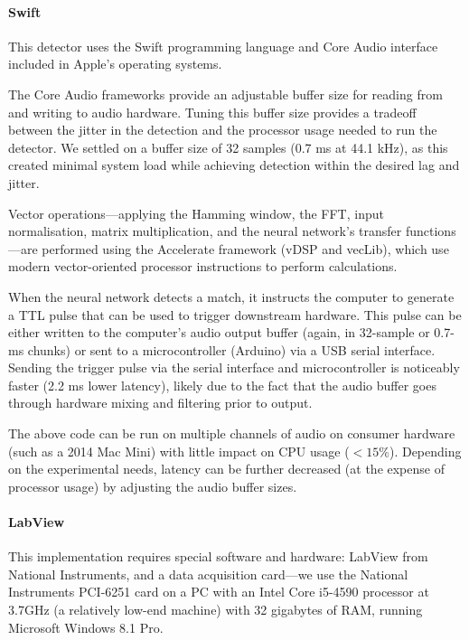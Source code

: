 \documentclass[10pt,letterpaper]{article}
\renewcommand{\subsubsection}[1]{\paragraph{#1}}
\begin{document}
\subsubsection{Swift}

This detector uses the Swift programming language and Core Audio
interface included in Apple's operating systems.

The Core Audio frameworks provide an adjustable buffer size for 
reading from and writing to audio hardware. Tuning this buffer size
provides a tradeoff between the jitter in the detection and the 
processor usage needed to run the detector. We settled on a buffer 
size of 32 samples (0.7 ms at 44.1 kHz), as this created minimal system
load while achieving detection within the desired lag and jitter.

Vector operations---applying the Hamming window, the FFT, input
normalisation, matrix multiplication, and the neural network's
transfer functions---are performed using the Accelerate framework (vDSP
and vecLib), which use modern vector-oriented processor instructions
to perform calculations.

When the neural network detects a match, it instructs the computer to
generate a TTL pulse that can be used to trigger downstream hardware.
This pulse can be either written to the computer's audio output buffer (again, in
32-sample or 0.7-ms chunks) or sent to a microcontroller (Arduino) via
a USB serial interface. Sending the trigger pulse via the serial
interface and microcontroller is noticeably faster (2.2 ms lower
latency), likely due to the fact that the audio buffer goes through
hardware mixing and filtering prior to output.

The above code can be run on multiple channels of audio on 
consumer hardware (such as a 2014 Mac Mini) with little impact
on CPU usage ($<15\%$). Depending on the experimental needs, latency
can be further decreased (at the expense of processor usage) by
adjusting the audio buffer sizes.

\subsubsection{LabView}

This implementation requires special software and hardware: LabView from National Instruments, and a data acquisition card---we use the National Instruments PCI-6251 card on a PC with an Intel Core i5-4590 processor at 3.7GHz (a relatively low-end machine) with 32 gigabytes of RAM, running Microsoft Windows 8.1 Pro.
\end{document}
